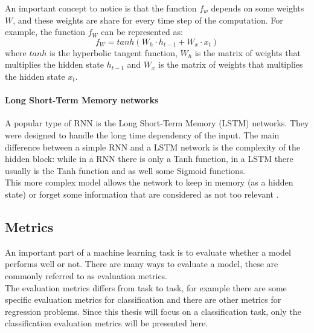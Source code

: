 An important concept to notice is that the function $f_w$ depends on some weights $W$, and these weights are share for every time step of the computation. For example, the function $f_W$ can be represented as:
\begin{equation}
    f_W = tanh(W_h \cdot h_{t-1} + W_x \cdot x_{t})
\end{equation}
\noindent where $tanh$ is the hyperbolic tangent function, $W_h$ is the matrix of weights that multiplies the hidden state $h_{t-1}$ and $W_x$ is the matrix of weights that multiplies the hidden state $x_{t}$. \\

\paragraph{Long Short-Term Memory networks}
A popular type of \gls{RNN} is the Long Short-Term Memory (\gls{LSTM}) networks. They were designed to handle the long time dependency of the input. The main difference between a simple \gls{RNN} and a \gls{LSTM} network is the complexity of the hidden block: while in a \gls{RNN} there is only a \gls{Tanh} function, in a \gls{LSTM} there usually is the \gls{Tanh} function and as well some Sigmoid functions. \\
This more complex model allows the network to keep in memory (as a hidden state) or forget some information that are considered as not too relevant \cite{lstm}.

\subsection{Metrics}
An important part of a machine learning task is to evaluate whether a model performs well or not. There are many ways to evaluate a model, these are commonly referred to as evaluation metrics.\\

The evaluation metrics differs from task to task, for example there are some specific evaluation metrics for classification and there are other metrics for regression problems. Since this thesis will focus on a classification task, only the classification evaluation metrics will be presented here.\\

